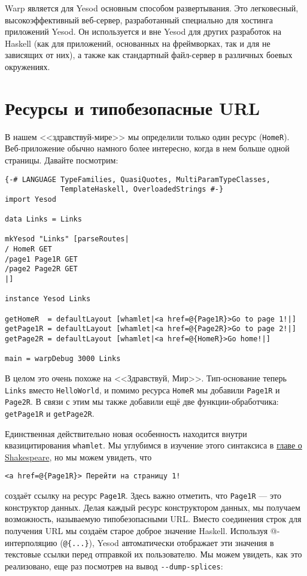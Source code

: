Warp является для Yesod основным способом развертывания. Это легковесный,
высокоэффективный веб-сервер, разработанный специально для хостинга приложений Yesod. Он
используется и вне Yesod для других разработок на Haskell (как для приложений, основанных
на фреймворках, так и для не зависящих от них), а также как стандартный файл-сервер в
различных боевых окружениях.

\section{Ресурсы и типобезопасные URL}

В нашем <<здравствуй-мире>> мы определили только один ресурс
(\lstinline!HomeR!). Веб-приложение обычно намного более интересно, когда в нем больше
одной страницы. Давайте посмотрим:

\begin{lstlisting}
{-# LANGUAGE TypeFamilies, QuasiQuotes, MultiParamTypeClasses,
             TemplateHaskell, OverloadedStrings #-}
import Yesod

data Links = Links

mkYesod "Links" [parseRoutes|
/ HomeR GET
/page1 Page1R GET
/page2 Page2R GET
|]

instance Yesod Links

getHomeR  = defaultLayout [whamlet|<a href=@{Page1R}>Go to page 1!|]
getPage1R = defaultLayout [whamlet|<a href=@{Page2R}>Go to page 2!|]
getPage2R = defaultLayout [whamlet|<a href=@{HomeR}>Go home!|]

main = warpDebug 3000 Links
\end{lstlisting}

В целом это очень похоже на <<Здравствуй, Мир>>. Тип-основание теперь \lstinline!Links!
вместо \lstinline!HelloWorld!, и помимо ресурса \lstinline!HomeR! мы добавили
\lstinline!Page1R! и \lstinline!Page2R!. В связи с этим мы также добавили ещё две
функции-обработчика: \lstinline!getPage1R! и \lstinline!getPage2R!.

Единственная действительно новая особенность находится внутри квазицитирования
\lstinline'whamlet'. Мы углубимся в изучение этого синтаксиса в
\hyperref[ch:shakespeare]{главе о Shakespeare}, но мы можем увидеть, что

\begin{lstlisting}
<a href=@{Page1R}> Перейти на страницу 1!
\end{lstlisting}
создаёт ссылку на ресурс \lstinline!Page1R!. Здесь важно отметить, что \lstinline!Page1R!
--- это конструктор данных. Делая каждый ресурс конструктором данных, мы получаем
возможность, называемую типобезопасными URL. Вместо соединения строк для получения URL мы
создаём старое доброе значение Haskell. Используя @-интерполяцию (\lstinline!@{...}!),
Yesod автоматически отображает эти значения в текстовые ссылки перед отправкой их
пользователю. Мы можем увидеть, как это реализовано, еще раз посмотрев на вывод
\lstinline!--dump-splices!:

